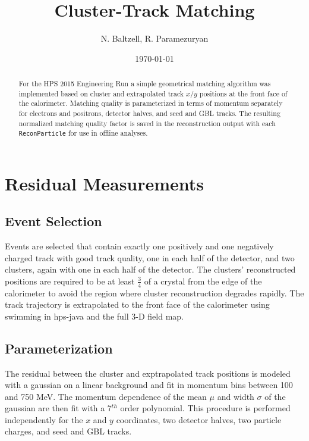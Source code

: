 \documentclass[amsmath,amssymb,notitlepage,12pt]{revtex4-1}
\begin{document}

\title{Cluster-Track Matching}
\author{N. Baltzell, R. Paramezuryan}
\date{\today}
\begin{abstract}
    For the HPS 2015 Engineering Run a simple geometrical matching algorithm was implemented based on cluster and extrapolated track $x/y$ positions at the front face of the calorimeter.  Matching quality is parameterized in terms of momentum separately for electrons and positrons, detector halves, and seed and GBL tracks.  The resulting normalized matching quality factor is saved in the reconstruction output with each \texttt{ReconParticle} for use in offline analyses.
\end{abstract}
\maketitle

\section{Residual Measurements}
\subsection{Event Selection}
Events are selected that contain exactly one positively and one negatively charged track with good track quality, one in each half of the detector, and two clusters, again with one in each half of the detector.  The clusters' reconstructed positions are required to be at least $\frac{3}{4}$ of a crystal from the edge of the calorimeter to avoid the region where cluster reconstruction degrades rapidly.  The track trajectory is extrapolated to the front face of the calorimeter using swimming in hps-java and the full 3-D field map.

\subsection{Parameterization}
The residual between the cluster and exptrapolated track positions is modeled with a gaussian on a linear background and fit in momentum bins between 100 and 750 MeV.  The momentum dependence of the mean $\mu$ and width $\sigma$ of the gaussian are then fit with a 7$^{th}$ order polynomial.  This procedure is performed independently for the $x$ and $y$ coordinates, two detector halves, two particle charges, and seed and GBL tracks.
\end{document}
